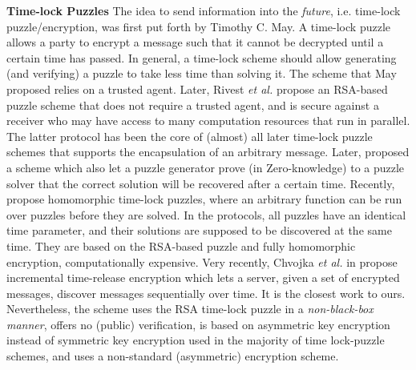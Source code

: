 
\noindent\textbf{Time-lock Puzzles}
The idea to send information into the \emph{future}, i.e.
time-lock puzzle/encryption, was first put forth by Timothy C. May. A time-lock puzzle allows a party to encrypt a message such that it cannot be decrypted  until a certain  time has passed. In general,  a  time-lock scheme should allow   generating (and verifying) a puzzle to take less time than solving it. The  scheme that May proposed relies on a trusted agent. Later, Rivest \textit{et al.} \cite{Rivest:1996:TPT:888615} propose an RSA-based puzzle scheme that does not require a trusted agent, and is secure against a receiver
who may have access to many  computation resources that run in parallel. The latter protocol has been the core of (almost) all later time-lock puzzle schemes that supports the encapsulation of an arbitrary message. Later, \cite{BonehN00,DBLP:conf/fc/GarayJ02} proposed a scheme which also let a puzzle generator  prove (in Zero-knowledge)  to a puzzle solver that the correct solution  will be recovered after a certain time.    Recently, \cite{MalavoltaT19,BrakerskiDGM19}  propose  homomorphic time-lock puzzles, where an arbitrary function can be run over puzzles before they are solved. In the protocols, all puzzles have an identical time parameter, and their solutions are supposed to be discovered at the same time. They  are based on the RSA-based puzzle  and   fully homomorphic encryption,  computationally expensive. Very recently, Chvojka \textit{et al.} in \cite{ChvojkaJSS20} propose  incremental time-release encryption which lets a server, given a set of encrypted messages, discover messages sequentially over time. It is the closest work to ours. Nevertheless, the scheme uses the RSA time-lock puzzle \cite{Rivest:1996:TPT:888615} in a \emph{non-black-box manner}, offers no (public) verification,  is based on  asymmetric key encryption instead of symmetric key encryption used in the majority of time lock-puzzle schemes, and uses a non-standard (asymmetric) encryption scheme. 




